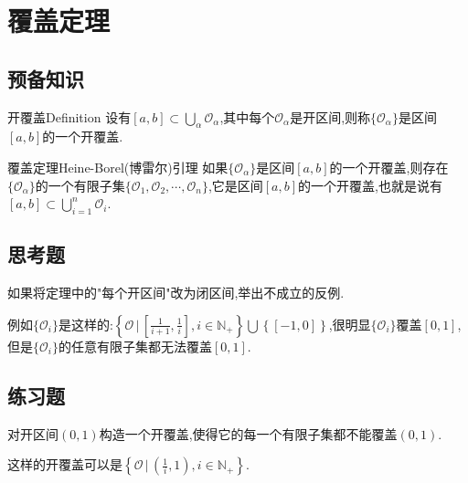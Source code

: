 \section{覆盖定理}
 \subsection{预备知识}
     \begin{definition}{开覆盖}{Definition}
         设有$[a,b]\subset\textstyle\bigcup_\alpha\mathcal{O} _\alpha$,其中每个$\mathcal{O}_\alpha$是开区间,则称$\{\mathcal{O}_\alpha\}$是区间$[a,b]$的一个开覆盖.
     \end{definition}
     \begin{theorem}{覆盖定理}{Heine-Borel(博雷尔)引理}
         如果$\{\mathcal{O}_\alpha\}$是区间$[a,b]$的一个开覆盖,则存在$\{\mathcal{O}_\alpha\}$的一个有限子集$\{\mathcal{O}_1,\mathcal{O}_2,\cdots,\mathcal{O}_n\}$,它是区间$[a,b]$的一个开覆盖,也就是说有$[a,b]\subset\textstyle\bigcup_{i=1}^n\mathcal{O}_i$.
     \end{theorem}
 \subsection{思考题}
     \begin{example}
         如果将定理中的"每个开区间"改为闭区间,举出不成立的反例.
     \end{example}
     \begin{solution}
         例如$\{\mathcal{O}_i\}$是这样的:$\left\{\mathcal{O}\, \bigg|\, \left[\frac{1}{i+1},\frac{1}{i}\right],i\in \mathbb{N}_+\right\}\textstyle\bigcup\left\{[-1,0]\right\}$,很明显$\{\mathcal{O}_i\}$覆盖$\left[0,1\right]$,但是$\{\mathcal{O}_i\}$的任意有限子集都无法覆盖$\left[0,1\right]$.
     \end{solution}

 \subsection{练习题}
     \begin{exercise}
         对开区间$(0,1)$构造一个开覆盖,使得它的每一个有限子集都不能覆盖$(0,1)$.
     \end{exercise}
     \begin{solution}
         这样的开覆盖可以是$\left\{\mathcal{O}\, \bigg|\, \left(\frac{1}{i},1\right),i\in\mathbb{N}_+\right\}$.
     \end{solution}


